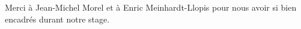 Merci à Jean-Michel Morel et à Enric Meinhardt-Llopis pour nous avoir si bien encadrés durant notre stage.
